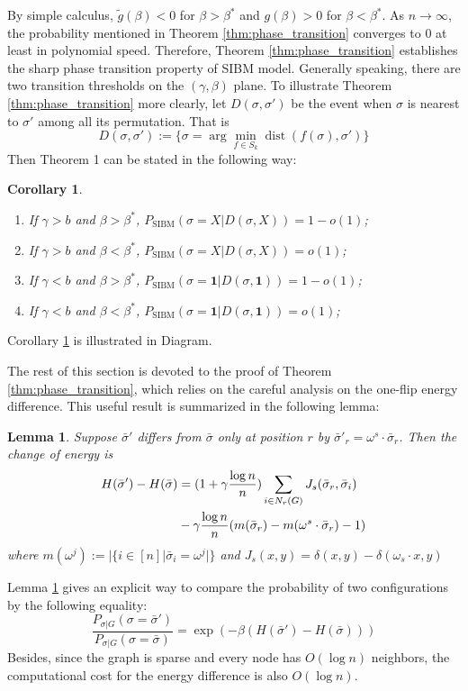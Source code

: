 \documentclass[journal]{IEEEtran}
\newtheorem{corollary}{Corollary}
\newtheorem{lemma}{Lemma}
\DeclareMathOperator{\SIBM}{SIBM}
\DeclareMathOperator{\dist}{dist}
\begin{document}
By simple calculus, $\tilde{g}(\beta) < 0$ for $\beta> \beta^*$ and $g(\beta)>0$ for $\beta < \beta^*$.
As $n \to \infty$, the probability mentioned in Theorem \ref{thm:phase_transition} converges to $0$ at least
in polynomial speed.
Therefore, Theorem \ref{thm:phase_transition} establishes the sharp phase transition property of SIBM model.
Generally speaking, there are two transition thresholds on the $(\gamma, \beta)$ plane. To illustrate Theorem
\ref{thm:phase_transition} more clearly,
let $D(\sigma, \sigma')$ be the event when $\sigma$ is nearest to $\sigma'$ among all its permutation.
That is
\begin{equation}
D(\sigma, \sigma') := \{ \sigma = \arg\min_{f \in S_k} \dist(f(\sigma), \sigma')  \}
\end{equation}
Then Theorem 1 can be stated in the following way:
\begin{corollary}\label{cor:phase4}
\begin{enumerate}
	\item If $\gamma > b$ and $\beta > \beta^*$, $P_{\SIBM}(\sigma = X | D(\sigma, X))  = 1-o(1)$;
	\item If $\gamma > b$ and $\beta < \beta^*$, $P_{\SIBM}(\sigma = X | D(\sigma, X))  = o(1)$;
\item If $\gamma < b$ and $\beta > \beta^*$, $P_{\SIBM}(\sigma = \mathbf{1} | D(\sigma,  \mathbf{1}))  = 1-o(1)$;	
	\item If $\gamma < b$ and $\beta < \beta^*$, $P_{\SIBM}(\sigma = \mathbf{1}| D(\sigma,  \mathbf{1}))  =  o(1)$;
\end{enumerate}	
\end{corollary}
Corollary \ref{cor:phase4} is illustrated in Diagram.

The rest of this section is devoted to the proof of Theorem \ref{thm:phase_transition}, which relies on the
careful analysis on the one-flip energy difference. This useful result is summarized in the following lemma:
\begin{lemma}\label{lem:lemmaDiff}
	Suppose $\bar{\sigma}'$ differs from $\bar{\sigma}$ only at position $r$ by $\bar{\sigma}'_r = \omega^s \cdot \bar{\sigma}_r$.
	Then the change of energy is
	\begin{align}
	H(\bar{\sigma}') - H(\bar{\sigma}) &= (1+\gamma \frac{\log n}{n})\sum_{i \in N_r(G)} J_s(\bar{\sigma}_r, \bar{\sigma}_i)
	\notag \\
	&- \gamma \frac{\log n}{n} (m(\bar{\sigma}_r)-m(\omega^s \cdot \bar{\sigma}_r)-1) 
	\end{align}
	where $m(\omega^j) := |\{i \in [n] | \bar{\sigma}_i = \omega^j | \}$ and $J_s(x, y) = \delta(x, y) - \delta(\omega_s \cdot x, y)$
\end{lemma}
Lemma \ref{lem:lemmaDiff} gives an explicit way to compare the probability of two configurations by the following
equality:
\begin{equation}\label{eq:Pratio}
\frac{P_{\sigma |G } (\sigma = \bar{\sigma}')}{P_{\sigma |G } (\sigma = \bar{\sigma})}
= \exp(-\beta(H(\bar{\sigma}') - H(\bar{\sigma})))
\end{equation}
Besides, since the graph is sparse and every node has $O(\log n)$ neighbors, the computational cost for the energy difference
is also $O(\log n)$. 
\end{document}

